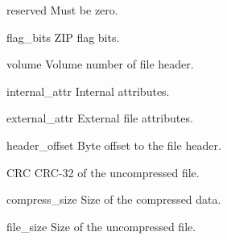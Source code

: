 \begin{memberdesc}[ZipInfo]{reserved}
  Must be zero.
\end{memberdesc}

\begin{memberdesc}[ZipInfo]{flag_bits}
  ZIP flag bits.
\end{memberdesc}

\begin{memberdesc}[ZipInfo]{volume}
  Volume number of file header.
\end{memberdesc}

\begin{memberdesc}[ZipInfo]{internal_attr}
  Internal attributes.
\end{memberdesc}

\begin{memberdesc}[ZipInfo]{external_attr}
 External file attributes.
\end{memberdesc}

\begin{memberdesc}[ZipInfo]{header_offset}
  Byte offset to the file header.
\end{memberdesc}

\begin{memberdesc}[ZipInfo]{CRC}
  CRC-32 of the uncompressed file.
\end{memberdesc}

\begin{memberdesc}[ZipInfo]{compress_size}
  Size of the compressed data.
\end{memberdesc}

\begin{memberdesc}[ZipInfo]{file_size}
  Size of the uncompressed file.
\end{memberdesc}
